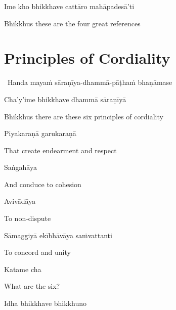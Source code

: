 Ime kho bhikkhave cattāro mahāpadesā'ti

\begin{english}
  Bhikkhus these are the four great references
\end{english}

\suttaRef{[AN 4.180]}

\ifdigitalversion{}\fi



\section{Principles of Cordiality}
\label{principles-of-cordiality}

\begin{leader}
  \anglebracketleft\ \hspace{-0.5mm}Handa mayaṁ sāraṇīya-dhammā-pāṭhaṁ bhaṇāmase \hspace{-0.5mm}\anglebracketright\
\end{leader}

Cha'y'ime bhikkhave dhammā sāraṇīyā

\begin{english}
  Bhikkhus there are these six principles of cordiality
\end{english}

Piyakaraṇā garukaraṇā

\begin{english}
  That create endearment and respect
\end{english}

Saṅgahāya

\begin{english}
  And conduce to cohesion
\end{english}

Avivādāya

\begin{english}
  To non-dispute
\end{english}

Sāmaggiyā ekībhāvāya saṁvattanti

\begin{english}
  To concord and unity
\end{english}

Katame cha

\begin{english}
  What are the six?
\end{english}

Idha bhikkhave bhikkhuno

